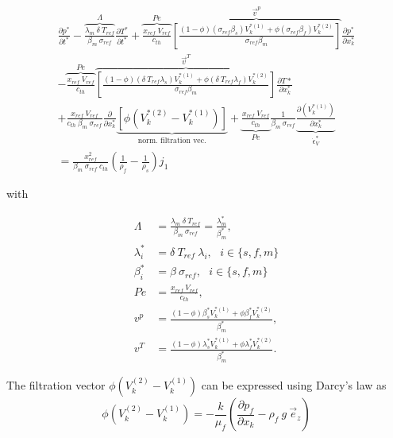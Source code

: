 \documentclass[]{scrreprt}
\begin{document}
\begin{multline}
  \label{eq:mixture_mass_balance5}
  \frac{\partial p^*}{\partial t^*} 
  - \overbrace{\frac{\lambda_m \: \delta \: T_{ref}}{\beta_m\:\sigma_{ref}}}^{\Lambda} \frac{\partial T^*}{\partial t^*} 
  + \overbrace{\frac{x_{ref}\:V_{ref}}{c_{th}}}^{Pe}  \overbrace{\left[\frac{(1-\phi)(\sigma_{ref}\beta_s) V^{*(1)}_k + \phi(\sigma_{ref}\beta_f) V^{*(2)}_k}{\sigma_{ref}\beta_m} \right]}^{\vec{v}^p} \frac{\partial p^*}{\partial x^*_k} \\
  - \overbrace{\frac{x_{ref}\:V_{ref}}{c_{th}}}^{Pe} \overbrace{\left[\frac{(1-\phi)(\delta\:T_{ref}\lambda_s) V^{*(1)}_k + \phi(\delta\:T_{ref}\lambda_f) V^{*(2)}_k}{\sigma_{ref}\beta_m} \right]}^{\vec{v}^T} \frac{\partial T*}{\partial x^*_k} \\
  + \frac{x_{ref}\:V_{ref}}{c_{th}\:\beta_m\:\sigma_{ref}}  \frac{\partial}{\partial x^*_k} \underbrace{\left[ \phi (V^{*(2)}_k -V^{*(1)}_k)\right]}_{\text{norm. filtration vec.}} 
  + \underbrace{\frac{x_{ref}\:V_{ref}}{c_{th}}}_{Pe} \frac{1}{\beta_m\:\sigma_{ref}} \underbrace{\frac{\partial(V^{*(1)}_k)}{\partial x^*_k}}_{\dot{\epsilon}^*_V}  \\
  = \frac{x^2_{ref}}{\beta_m\:\sigma_{ref}\:c_{th}} \left(\frac{1}{\rho_f} - \frac{1}{\rho_s}\right)j_1
\end{multline}

with

\begin{subequations}
  \label{eq:def_parameters}
  \begin{align}
  \Lambda &= \frac{\lambda_m \: \delta \: T_{ref}}{\beta_m\:\sigma_{ref}}=\frac{\lambda^*_m}{\beta^*_m}, \\   
  \lambda^*_i &= \delta \: T_{ref} \:\lambda_i, \:\:\: i\in\{s,f,m\}\\
  \beta^*_i &= \beta \: \sigma_{ref}, \:\:\: i\in\{s,f,m\}\\
  Pe &= \frac{x_{ref}\:V_{ref}}{c_{th}}, \\   
  v^p &= \frac{(1-\phi)\beta^*_s V^{*(1)}_k + \phi\beta^*_f V^{*(2)}_k}{\beta^*_m}, \\   
  v^T &= \frac{(1-\phi)\lambda^*_s V^{*(1)}_k + \phi\lambda^*_f V^{*(2)}_k}{\beta^*_m}.
  \end{align}
\end{subequations}

The filtration vector $\phi(V^{(2)}_k -V^{(1)}_k)$ can be expressed using Darcy's law as
\begin{equation}
  \label{eq:darcy}
  \phi(V^{(2)}_k -V^{(1)}_k) = -\frac{k}{\mu_f} \left(\frac{\partial p_f}{\partial x_k} - \rho_f\:g\:\vec{e}_z \right)
\end{equation}
\end{document}

